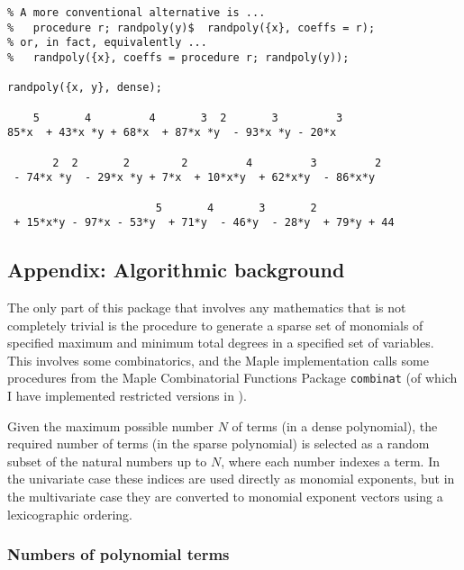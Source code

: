 \begin{verbatim}
% A more conventional alternative is ...
%   procedure r; randpoly(y)$  randpoly({x}, coeffs = r);
% or, in fact, equivalently ...
%   randpoly({x}, coeffs = procedure r; randpoly(y));

randpoly({x, y}, dense);

    5       4         4       3  2       3         3
85*x  + 43*x *y + 68*x  + 87*x *y  - 93*x *y - 20*x

       2  2       2        2         4         3         2
 - 74*x *y  - 29*x *y + 7*x  + 10*x*y  + 62*x*y  - 86*x*y

                       5       4       3       2
 + 15*x*y - 97*x - 53*y  + 71*y  - 46*y  - 28*y  + 79*y + 44
\end{verbatim}




\newtheorem{prop}{Proposition}

\newenvironment{randpproof}%
   {\par\addvspace\baselineskip\noindent{\bf Proof~}}%
   {\hspace*{\fill}$\Box$\par\addvspace\baselineskip}

\subsection{Appendix: Algorithmic background}

The only part of this package that involves any mathematics that is
not completely trivial is the procedure to generate a sparse set of
monomials of specified maximum and minimum total degrees in a
specified set of variables.  This involves some combinatorics, and the
Maple implementation calls some procedures from the Maple
Combinatorial Functions Package \texttt{combinat} (of which I have
implemented restricted versions in \REDUCE).

Given the maximum possible number $N$ of terms (in a dense
polynomial), the required number of terms (in the sparse polynomial)
is selected as a random subset of the natural numbers up to $N$, where
each number indexes a term.  In the univariate case these indices are
used directly as monomial exponents, but in the multivariate case they
are converted to monomial exponent vectors using a lexicographic
ordering.


\subsubsection{Numbers of polynomial terms}

